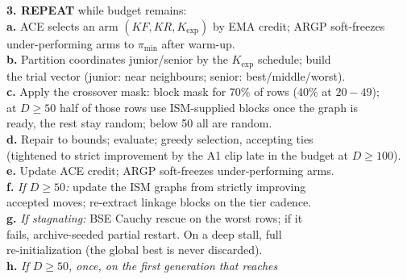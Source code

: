 \documentclass[11pt,a4paper]{article}
\begin{document}
\begin{tcolorbox}[breakable, colback=boxgrey, colframe=black!45, boxrule=0.4pt,
  arc=2pt, left=3.5mm, right=2.5mm, top=2mm, bottom=2mm]
{\textbf{3. REPEAT} while budget remains:\\
\hspace*{4mm}\textbf{a.} ACE selects an arm $(KF, KR, K_{\exp})$ by EMA credit;
ARGP soft-freezes\\
\hspace*{9mm}under-performing arms to $\pi_{\min}$ after warm-up.\\
\hspace*{4mm}\textbf{b.} Partition coordinates junior/senior by the $K_{\exp}$ schedule;
build\\
\hspace*{9mm}the trial vector (junior: near neighbours; senior: best/middle/worst).\\
\hspace*{4mm}\textbf{c.} Apply the crossover mask: block mask for 70\% of rows
(40\% at $20\!-\!49$);\\
\hspace*{9mm}at $D\geq50$ half of those rows use ISM-supplied blocks once the
graph is\\
\hspace*{9mm}ready, the rest stay random; below 50 all are random.\\
\hspace*{4mm}\textbf{d.} Repair to bounds; evaluate; greedy selection, accepting ties\\
\hspace*{9mm}(tightened to strict improvement by the A1 clip late in the budget at $D\geq100$).\\
\hspace*{4mm}\textbf{e.} Update ACE credit; ARGP soft-freezes under-performing arms.\\
\hspace*{4mm}\textbf{f.} \emph{If $D\geq50$:} update the ISM graphs from strictly improving\\
\hspace*{9mm}accepted moves; re-extract linkage blocks on the tier cadence.\\
\hspace*{4mm}\textbf{g.} \emph{If stagnating:} BSE Cauchy rescue on the worst rows; if it\\
\hspace*{9mm}fails, archive-seeded partial restart. On a deep stall, full\\
\hspace*{9mm}re-initialization (the global best is never discarded).\\
\hspace*{4mm}\textbf{h.} \emph{If $D\geq50$, once, on the first generation that reaches}\\
}
\end{tcolorbox}
\end{document}
